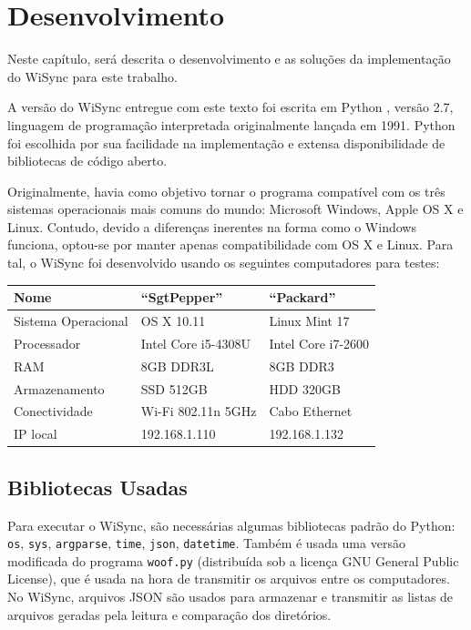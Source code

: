 \chapter{Desenvolvimento}
\label{desenvolvimento}
Neste capítulo, será descrita o desenvolvimento e as soluções da implementação do WiSync para este trabalho.

A versão do WiSync entregue com este texto foi escrita em Python \cite{python}, versão 2.7, linguagem de programação interpretada originalmente lançada em 1991.
Python foi escolhida por sua facilidade na implementação e extensa disponibilidade de bibliotecas de código aberto.

Originalmente, havia como objetivo tornar o programa compatível com os três sistemas operacionais mais comuns do mundo: Microsoft Windows, Apple OS X e Linux.
Contudo, devido a diferenças inerentes na forma como o Windows funciona, optou-se por manter apenas compatibilidade com OS X e Linux.
Para tal, o WiSync foi desenvolvido usando os seguintes computadores para testes:

\begin{center}
  \begin{tabular}{ l | l | l }
    \hline
    \textbf{Nome} & ``SgtPepper'' & ``Packard'' \\ \hline \hline
    Sistema Operacional & OS X 10.11 & Linux Mint 17 \\ \hline
    Processador & Intel Core i5-4308U & Intel Core i7-2600 \\ \hline
    RAM & 8GB DDR3L & 8GB DDR3 \\ \hline
    Armazenamento & SSD 512GB & HDD 320GB \\ \hline
    Conectividade & Wi-Fi 802.11n 5GHz & Cabo Ethernet \\ \hline
    IP local & 192.168.1.110 & 192.168.1.132 \\
    \hline
  \end{tabular}
\end{center}

\section{Bibliotecas Usadas}
Para executar o WiSync, são necessárias algumas bibliotecas padrão do Python: \texttt{os}, \texttt{sys}, \texttt{argparse}, \texttt{time}, \texttt{json}, \texttt{datetime}.
Também é usada uma versão modificada do programa \texttt{woof.py} \cite{woof} (distribuída sob a licença GNU General Public License), que é usada na hora de transmitir os arquivos entre os computadores.
No WiSync, arquivos JSON são usados para armazenar e transmitir as listas de arquivos geradas pela leitura e comparação dos diretórios.

